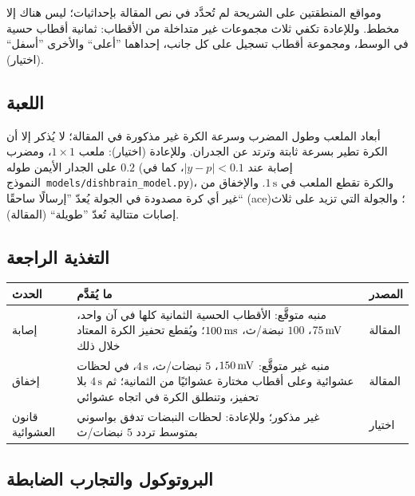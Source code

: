 ومواقع المنطقتين على الشريحة لم تُحدَّد في نص المقالة بإحداثيات؛ ليس هناك إلا مخطط. وللإعادة تكفي ثلاث مجموعات غير متداخلة من الأقطاب: ثمانية أقطاب حسية في الوسط، ومجموعة أقطاب تسجيل على كل جانب، إحداهما ”أعلى“ والأخرى ”أسفل“ (اختيار).

\subsection*{اللعبة}

أبعاد الملعب وطول المضرب وسرعة الكرة غير مذكورة في المقالة؛ لا يُذكر إلا أن الكرة تطير بسرعة ثابتة وترتد عن الجدران. وللإعادة (اختيار): ملعب $1\times1$، ومضرب على الجدار الأيمن طوله $0.2$ (إصابة عند $|y-p|<0.1$، كما في النموذج~\foreignlanguage{english}{\texttt{models/dishbrain\_model.py}})، والكرة تقطع الملعب في $1\,\text{s}$. والإخفاق من غير أي كرة مصدودة في الجولة يُعدّ ”إرسالًا ساحقًا“ (\foreignlanguage{english}{ace})؛ والجولة التي تزيد على ثلاث إصابات متتالية تُعدّ ”طويلة“ (المقالة).

\subsection*{التغذية الراجعة}

\begin{center}
\footnotesize
\setlength{\tabcolsep}{4pt}
\renewcommand{\arraystretch}{1.15}
\begin{tabular}{>{\raggedright}p{2.6cm}>{\raggedright}p{8.3cm}>{\raggedright\arraybackslash}p{1.6cm}}
\toprule
الحدث & ما يُقدَّم & المصدر \\
\midrule
إصابة & منبه متوقَّع: الأقطاب الحسية الثمانية كلها في آن واحد، $75\,\text{mV}$، $100$ نبضة/ث، $100\,\text{ms}$؛ ويُقطع تحفيز الكرة المعتاد خلال ذلك & المقالة \\
إخفاق & منبه غير متوقَّع: $150\,\text{mV}$، $5$ نبضات/ث، $4\,\text{s}$، في لحظات عشوائية وعلى أقطاب مختارة عشوائيًا من الثمانية؛ ثم $4\,\text{s}$ بلا تحفيز، وتنطلق الكرة في اتجاه عشوائي & المقالة \\
قانون العشوائية & غير مذكور؛ وللإعادة: لحظات النبضات تدفق بواسوني بمتوسط تردد $5$ نبضات/ث & اختيار \\
\bottomrule
\end{tabular}
\end{center}

\subsection*{البروتوكول والتجارب الضابطة}


